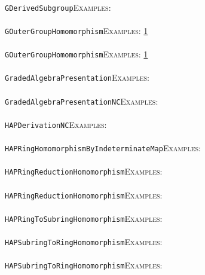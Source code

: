 \documentclass[a4paper,11pt]{report}
\begin{document}
{{ \\
 \texttt{GDerivedSubgroup}{\nobreakspace}{\nobreakspace}{\nobreakspace}{\nobreakspace}\textsc{Examples:} \\
 \\
 \texttt{GOuterGroupHomomorphism}{\nobreakspace}{\nobreakspace}{\nobreakspace}{\nobreakspace}\textsc{Examples:} \href{../www/SideLinks/About/aboutCoefficientSequence.html} {1}{\nobreakspace} \\
 \\
 \texttt{GOuterGroupHomomorphism}{\nobreakspace}{\nobreakspace}{\nobreakspace}{\nobreakspace}\textsc{Examples:} \href{../www/SideLinks/About/aboutCoefficientSequence.html} {1}{\nobreakspace} \\
 \\
 \texttt{GradedAlgebraPresentation}{\nobreakspace}{\nobreakspace}{\nobreakspace}{\nobreakspace}\textsc{Examples:} \\
 \\
 \texttt{GradedAlgebraPresentationNC}{\nobreakspace}{\nobreakspace}{\nobreakspace}{\nobreakspace}\textsc{Examples:} \\
 \\
 \texttt{HAPDerivationNC}{\nobreakspace}{\nobreakspace}{\nobreakspace}{\nobreakspace}\textsc{Examples:} \\
 \\
 \texttt{HAPRingHomomorphismByIndeterminateMap}{\nobreakspace}{\nobreakspace}{\nobreakspace}{\nobreakspace}\textsc{Examples:} \\
 \\
 \texttt{HAPRingReductionHomomorphism}{\nobreakspace}{\nobreakspace}{\nobreakspace}{\nobreakspace}\textsc{Examples:} \\
 \\
 \texttt{HAPRingReductionHomomorphism}{\nobreakspace}{\nobreakspace}{\nobreakspace}{\nobreakspace}\textsc{Examples:} \\
 \\
 \texttt{HAPRingToSubringHomomorphism}{\nobreakspace}{\nobreakspace}{\nobreakspace}{\nobreakspace}\textsc{Examples:} \\
 \\
 \texttt{HAPSubringToRingHomomorphism}{\nobreakspace}{\nobreakspace}{\nobreakspace}{\nobreakspace}\textsc{Examples:} \\
 \\
 \texttt{HAPSubringToRingHomomorphism}{\nobreakspace}{\nobreakspace}{\nobreakspace}{\nobreakspace}\textsc{Examples:} \\
 \\
}}
\end{document}
